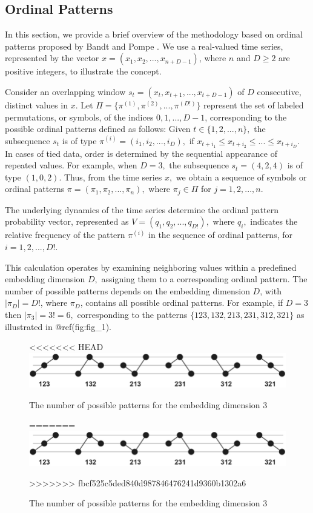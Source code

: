 \documentclass[sn-basic,pdflatex]{sn-jnl}
\theoremstyle{remark}
\theoremstyle{definition}
\begin{document}
\subsection{Ordinal Patterns}\label{ordinal-patterns}

In this section, we provide a brief overview of the methodology based on
ordinal patterns proposed by Bandt and Pompe
\citep{PhysRevLett.88.174102}. We use a real-valued time series,
represented by the vector \(x = (x_1, x_2, ..., x_{n+D-1})\), where
\(n\) and \(D\ge 2\) are positive integers, to illustrate the concept.

Consider an overlapping window \(s_t=(x_t, x_{t+1}, ..., x_{t+D-1})\) of
\(D\) consecutive, distinct values in \(x\). Let
\(\Pi=\{\pi^{(1)}, \pi^{(2)}, ..., \pi^{(D!)}\}\) represent the set of
labeled permutations, or symbols, of the indices \(0,1,...,D-1\),
corresponding to the possible ordinal patterns defined as follows: Given
\(t \in \{1,2,...,n\},\) the subsequence \(s_t\) is of type
\(\pi^{(i)}=(i_1, i_2, ..., i_D),\) if
\(x_{t+i_1}\le x_{t+i_2} \le ...\le x_{t+i_D}.\) In cases of tied data,
order is determined by the sequential appearance of repeated values. For
example, when \(D=3,\) the subsequence \(s_t=(4,2,4)\) is of type
\((1,0,2)\). Thus, from the time series \(x,\) we obtain a sequence of
symbols or ordinal patterns \(\pi=(\pi_1, \pi_2, ..., \pi_n),\) where
\(\pi_j \in \Pi\) for \(j=1,2,...,n.\)

The underlying dynamics of the time series determine the ordinal pattern
probability vector, represented as \(V = (q_1,q_2, ..., q_{D!}),\) where
\(q_i,\) indicates the relative frequency of the pattern \(\pi^{(i)}\)
in the sequence of ordinal patterns, for \(i=1,2,...,D!.\)

This calculation operates by examining neighboring values within a
predefined embedding dimension \(D,\) assigning them to a corresponding
ordinal pattern. The number of possible patterns depends on the
embedding dimension \(D\), with \(|\pi_D|=D!\), where \(\pi_D\),
contains all possible ordinal patterns. For example, if \(D=3\) then
\(|\pi_3|=3!=6,\) corresponding to the patterns
\(\{123, 132, 213, 231, 312, 321\}\) as illustrated in @ref(fig:fig\_1).

\begin{figure}
<<<<<<< HEAD
\includegraphics{./fig_1} \caption{The number of possible patterns for the embedding dimension 3}\label{fig:fig_1}
=======
\includegraphics[width=11.81in,]{./fig_1} \caption{The number of possible patterns for the embedding dimension 3}\label{fig:unnamed-chunk-1}
>>>>>>> fbcf525c5ded840d987846476241d9360b1302a6
\end{figure}
\end{document}
